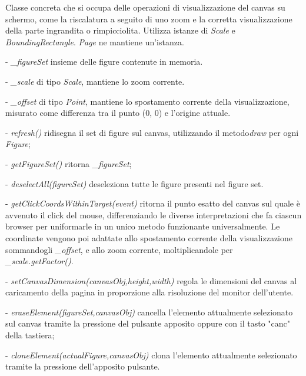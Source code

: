 Classe concreta che si occupa delle operazioni di visualizzazione del canvas su schermo, come la riscalatura a seguito di uno zoom e la corretta visualizzazione della parte ingrandita o rimpicciolita.
Utilizza istanze di \textit{Scale} e \textit{BoundingRectangle}.
\textit{Page} ne mantiene un'istanza.
\begin{elencopuntato}[\subsubsecindent]
\item[-] \textit{{\_}figureSet} insieme delle figure contenute in memoria.
\item[-] \textit{{\_}scale} di tipo \textit{Scale}, mantiene lo zoom corrente.
\item[-] \textit{{\_}offset} di tipo \textit{Point}, mantiene lo spostamento corrente della visualizzazione, misurato come differenza tra il punto (0, 0) e l'origine attuale.
\end{elencopuntato}
\begin{elencopuntato}[\subsubsecindent]
\item[-] \textit{refresh()} ridisegna il set di figure sul canvas, utilizzando il metodo\textit{draw} per ogni \textit{Figure};
\item[-] \textit{getFigureSet()} ritorna \textit{{\_}figureSet};
\item[-] \textit{deselectAll(figureSet)} deseleziona tutte le figure presenti nel figure set.
\item[-] \textit{getClickCoordsWithinTarget(event)} ritorna il punto esatto del canvas sul quale \`  e avvenuto il click  del mouse, differenziando le diverse interpretazioni che fa ciascun browser per uniformarle in un unico metodo funzionante universalmente.
Le coordinate vengono poi adattate allo spostamento corrente della visualizzazione sommandogli \textit{{\_}offset}, e allo zoom corrente, moltiplicandole per \textit{{\_}scale.getFactor()}.
\item[-] \textit{setCanvasDimension(canvasObj,height,width)} regola le dimensioni del canvas al caricamento della pagina in proporzione alla risoluzione del monitor dell'utente.
\item[-] \textit{eraseElement(figureSet,canvasObj)} cancella l'elemento attualmente selezionato sul canvas tramite la pressione del pulsante apposito oppure con il tasto "canc" della tastiera;
\item[-] \textit{cloneElement(actualFigure,canvasObj)} clona l'elemento attualmente selezionato tramite la pressione dell'apposito pulsante.
\end{elencopuntato}

